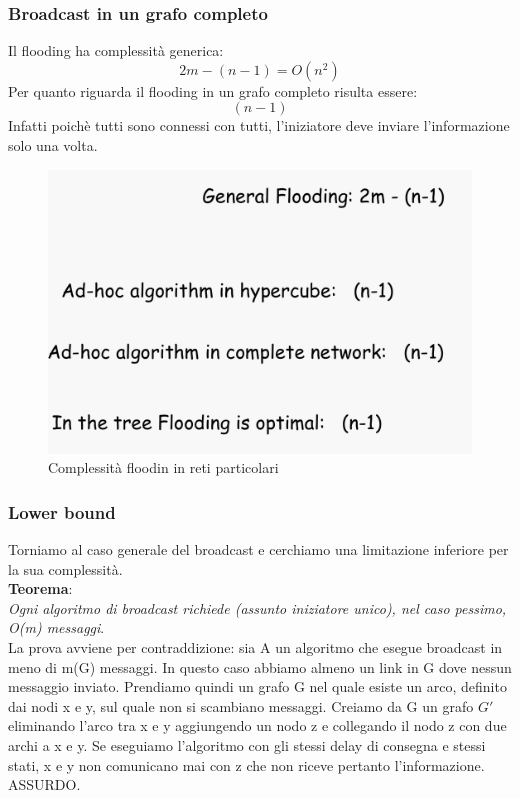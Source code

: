 \documentclass[12pt]{article}
\begin{document}
		\subsubsection{Broadcast in un grafo completo}
			Il flooding ha complessità generica:
			$$2m-(n-1)=O(n^{2}) $$ 
			Per quanto riguarda il flooding in un grafo completo risulta essere:
			$$(n-1) $$
			Infatti poichè tutti sono connessi con tutti, l'iniziatore deve inviare l'informazione solo una volta.
		\begin{figure}[h!]
			\centering
			\includegraphics[scale=0.3]{img/flo.png}
			\caption{Complessità floodin in reti particolari}
		\end{figure}
		\subsubsection{Lower bound}
			Torniamo al caso generale del broadcast e cerchiamo una limitazione inferiore per la sua complessità.\\ \textbf{Teorema}:\\
			\textit{Ogni algoritmo di broadcast richiede (assunto iniziatore unico), nel caso pessimo, O(m) messaggi}.\\
			La prova avviene per contraddizione: sia A un algoritmo che esegue broadcast in meno di m(G) messaggi. In questo caso abbiamo almeno un link in G dove nessun messaggio inviato. Prendiamo quindi un grafo G nel quale esiste un arco, definito dai nodi x e y, sul quale non si scambiano messaggi. Creiamo da G un grafo $G'$ eliminando l'arco tra x e y aggiungendo un nodo z e collegando il nodo z con due archi a x e y. Se eseguiamo l'algoritmo con gli stessi delay di consegna e stessi stati, x e y non comunicano mai con z che non riceve pertanto l'informazione. ASSURDO.
				
\end{document}
